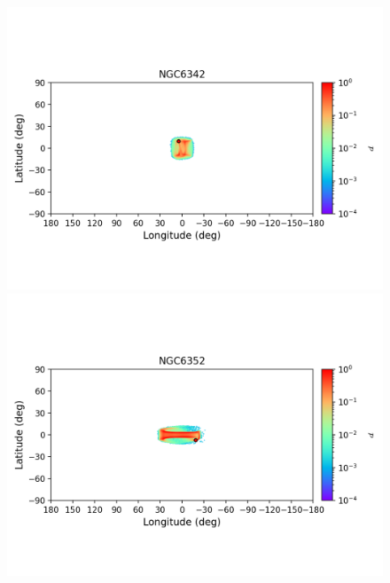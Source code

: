 \begin{figure}
\begin{center}
                \includegraphics[clip=true, trim = 0mm 20mm 0mm 10mm, width=1\columnwidth]{images/error_plots_NGC6342.png}
                \includegraphics[clip=true, trim = 0mm 20mm 0mm 10mm, width=1\columnwidth]{images/error_plots_NGC6352.png}
                

\end{center}
\end{figure}
